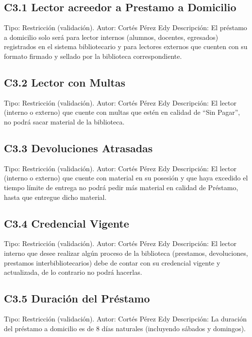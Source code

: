 \subsection{C3.1 Lector acreedor a Prestamo a Domicilio}
	\UCli Tipo: Restricción (validación).
	\UCli Autor: Cortés Pérez Edy
	\UCli Descripción: El préstamo a domicilio solo será para lector internos (alumnos, docentes, egresados) registrados en el sistema bibliotecario y para lectores externos que cuenten con su formato firmado y sellado por la biblioteca correspondiente.

\subsection{C3.2 Lector con Multas}
	\UCli Tipo: Restricción (validación).
	\UCli Autor: Cortés Pérez Edy
	\UCli Descripción: El lector (interno o externo) que cuente con multas que estén en calidad de “Sin Pagar”, no podrá sacar material de la biblioteca.
	
\subsection{C3.3 Devoluciones Atrasadas}
	\UCli Tipo: Restricción (validación).
	\UCli Autor: Cortés Pérez Edy
	\UCli Descripción: El lector (interno o externo) que cuente con material en su posesión y que haya excedido el tiempo límite de entrega no podrá pedir más material en calidad de Préstamo, hasta que entregue dicho material.
	
\subsection{C3.4 Credencial Vigente}
	\UCli Tipo: Restricción (validación).
	\UCli Autor: Cortés Pérez Edy
	\UCli Descripción: El lector interno que desee realizar algún proceso de la biblioteca (prestamos, devoluciones, prestamos interbibliotecarios) debe de contar con su credencial vigente y actualizada, de lo contrario no podrá hacerlas.

\subsection{C3.5 Duración del Préstamo}
	\UCli Tipo: Restricción (validación).
	\UCli Autor: Cortés Pérez Edy
	\UCli Descripción: La duración del préstamo a domicilio es de 8 días naturales (incluyendo sábados y domingos).
	
